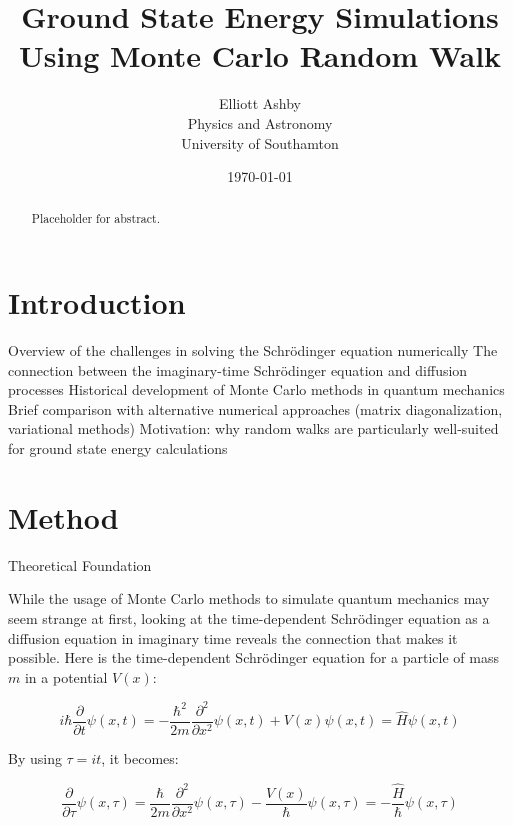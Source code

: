 \documentclass[reqno]{amsart}
\title{Ground State Energy Simulations Using Monte Carlo Random Walk}
\author[Elliott Ashby]{Elliott Ashby \\ Physics and Astronomy \\ University of Southamton}
\date{\monthyeardate\today}
\makeatletter
\renewcommand\subsection{\@startsection{subsection}{2}%
  \z@{.5\linespacing\@plus.7\linespacing}{-.5em}%
  {\normalfont\scshape\justify}}
\numberwithin{equation}{section}
\numberwithin{figure}{section}
\makeatother
\begin{document}
\begin{abstract}
    Placeholder for abstract.
\end{abstract}
\maketitle
\tableofcontents
\newpage
\section{Introduction}


Overview of the challenges in solving the Schrödinger equation numerically
The connection between the imaginary-time Schrödinger equation and diffusion processes
Historical development of Monte Carlo methods in quantum mechanics
Brief comparison with alternative numerical approaches (matrix diagonalization, variational methods)
Motivation: why random walks are particularly well-suited for ground state energy calculations

\section{Method}
\subsection{Theoretical Foundation}

While the usage of Monte Carlo methods to simulate quantum mechanics may seem strange at first, looking at the time-dependent Schrödinger equation as a diffusion equation in imaginary time reveals the connection that makes it possible. Here is the time-dependent Schrödinger equation for a particle of mass $m$ in a potential $V(x)$:

\begin{equation}
    i\hbar\frac{\partial}{\partial t}\psi(x,t) = -\frac{\hbar^2}{2m}\frac{\partial^2}{\partial x^2}\psi(x,t) + V(x)\psi(x,t) = \hat{H}\psi(x,t)
\end{equation}

By using $\tau = it$, it becomes:

\begin{equation}
    \frac{\partial}{\partial \tau}\psi(x,\tau) = \frac{\hbar}{2m}\frac{\partial^2}{\partial x^2}\psi(x,\tau) - \frac{V(x)}{\hbar}\psi(x,\tau) = -\frac{\hat{H}}{\hbar}\psi(x,\tau)
    \label{eq:diffusion}
\end{equation}
\end{document}
